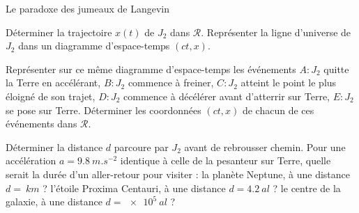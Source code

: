 \begin{exo}[PC][1][devoir]{Le paradoxe des jumeaux de Langevin}
\begin{quest}
\item Déterminer la trajectoire $x(t)$ de $J_2$ dans $\mathcal{R}$. Représenter la ligne d'universe de $J_2$ dans un diagramme d'espace-temps $(c t, x)$.
\item Représenter sur ce même diagramme d'espace-temps les événements $A: J_2$ quitte la Terre en accélérant, $B: J_2$ commence à freiner, $C: J_2$ atteint le point le plus éloigné de son trajet, $D: J_2$ commence à décélérer avant d'atterrir sur Terre, $E: J_2$ se pose sur Terre. Déterminer les coordonnées $(c t, x)$ de chacun de ces événements dans $\mathcal{R}$. 
\item Déterminer la distance $d$ parcoure par $J_2$ avant de rebrousser chemin. Pour une accélération $a=\SI{9,8}{m.s^{-2}}$ identique à celle de la pesanteur sur Terre, quelle serait la durée d’un aller-retour pour visiter : la planète Neptune, à une distance $d=\SI{}{km}$ ? 
 l’étoile Proxima Centauri, à une distance $d=\SI{4,2}{a l}$ ? le centre de la galaxie, à une distance $d=\SI{e5}{a l}$ ?
\end{quest}

\end{exo}

